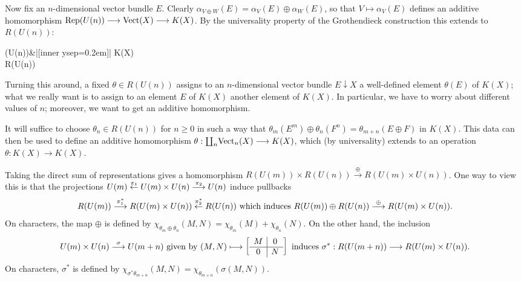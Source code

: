 Now fix an $n$-dimensional vector bundle $E$. Clearly $\alpha_{V \oplus W}(E) = \alpha_V(E) \oplus \alpha_W(E)$, so that $V \mapsto \alpha_V(E)$ defines an additive homomorphism $\Rep(U(n)) \to \Vect(X) \to K(X)$. By the universality property of the Grothendieck construction this extends to $R (U(n))$:
\begin{ctikzcd}
\Rep(U(n))\dar\rar["\alpha_-(E)"] &|[inner ysep=0.2em]| K(X)\\
R(U(n))\urar["\theta\mapsto\theta(E)"{sloped, anchor=north}]
\end{ctikzcd}

Turning this around, a fixed $\theta \in R (U(n))$ assigns to an $n$-dimensional vector bundle $E \downarrow X$ a well-defined element $\theta(E)$ of $K(X)$; what we really want is to assign to an element $E$ of $K(X)$ another element of $K(X)$.  In particular, we have to worry about different values of $n$; moreover, we want to get an additive homomorphism.

It will suffice to choose $\theta_n \in R(U(n))$ for $n \ge 0$ in such a way that $\theta_m (E^m) \oplus \theta_n (F^n) = \theta_{m+n}(E \oplus F)$ in $K(X)$. This data can then be used to define an additive homomorphism $\theta:\coprod_n\! \Vect_n(X) \to K(X)$, which (by universality) extends to an operation $\theta:K(X)\to K(X)$.

Taking the direct sum of representations gives a homomorphism $R(U(m)) \times R(U(n)) \stackrel{\oplus}{\to} R(U(m) \times U(n))$. One way to view this is that the projections $U(m) \stackrel{\pi_1}{\from} U(m) \times U(n) \stackrel{\pi_2}{\to} U(n)$ induce pullbacks
\[R(U(m))\stackrel{\pi_1^*}{\to}R(U(m) \times U(n))\stackrel{\pi_2^*}{\from}R(U(n))\textup{ which induces } R(U(m)) \oplus R(U(n)) \stackrel{\oplus}{\to} R(U(m) \times U(n)).\]
On characters, the map $\oplus$ is defined by $\chi_{\theta_m \oplus \theta_n}(M, N) = \chi_{\theta_m}(M) + \chi_{\theta_n}(N)$.  On the other hand, the inclusion
\[U(m) \times U(n) \stackrel{\sigma}{\to} U(m+n)\text{ given by }(M, N) \mapsto \left[\begin{array}{c|c}M & 0 \\ \hline 0 & N\end{array}\right]
\textup{ induces }\sigma^*: R(U(m+n)) \to R(U(m) \times U(n)).\]
On characters, $\sigma^*$ is defined by $\chi_{\sigma^* \theta_{m+n}}(M, N) = \chi_{\theta_{m+n}}\left(\sigma(M,N)\right)$.

